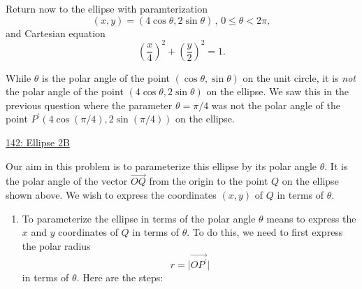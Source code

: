 \documentclass{ximera}
\begin{document}
\begin{example} \label{EX:9dfrebbvcxbfg}
Return now to the ellipse with paramterization
\[
      (x,y) = (4\cos \theta , 2\sin\theta) \, , \, 0\leq \theta <2\pi ,
\]
and Cartesian equation
\[
     \left( \frac{x}{4} \right)^2 + \left( \frac{y}{2} \right)^2 = 1.
\]

While $\theta$ is the polar angle of the point $(\cos\theta, \sin\theta)$ on the unit circle, it is \emph{not} the polar angle of the point $(4\cos \theta , 2\sin\theta)$ on the ellipse. We saw this in the previous question where the parameter $\theta=\pi/4$ was not the polar angle of the point $P^\prime(4\cos (\pi/4) , 2\sin (\pi/4))$ on the ellipse.




\begin{onlineOnly}
    \begin{center}
\end{center}
\end{onlineOnly}

\href{https://www.desmos.com/calculator/3skcbdibwx}{142: Ellipse 2B}

Our aim in this problem is to parameterize this ellipse by its polar angle $\theta$.  It is the polar angle of the vector $\overrightarrow{OQ}$ from the origin to the point $Q$ on the ellipse shown above. We wish to express the coordinates $(x,y)$ of $Q$ in terms of $\theta$.


\begin{enumerate}

\item To parameterize the ellipse in terms of the polar angle $\theta$ means to express the $x$ and $y$ coordinates of $Q$ in terms of $\theta$. To do this, we need to first express the polar radius  
\[
   r = \Big| \overrightarrow{OP^\prime}  \Big|
\]
in terms of $\theta$. Here are the steps:



\end{enumerate}
\end{example}
\end{document}
